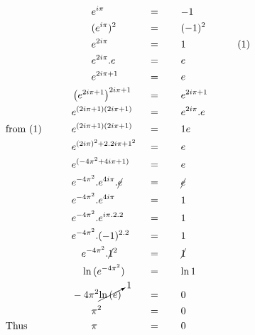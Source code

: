 \begin{alignat*}{4}
&\,&&\qquad e^{i\pi}&&\,=\qquad-1\\
&\,&&\qquad (e^{i\pi})^2&&\,=\qquad(-1)^2\\
&\,&&\qquad e^{2i\pi}&&\,=\qquad1&&\qquad(1)\\
&\,&&\qquad e^{2i\pi}.e&&\,=\qquad e\\
&\,&&\qquad e^{2i\pi+1}&&\,=\qquad e\\
&\,&&\left(e^{2i\pi+1}\right)^{2i\pi+1}&&\,=\qquad e^{2i\pi+1}\\
&\,&&e^{(2i\pi+1)(2i\pi+1)}&&\,=\qquad e^{2i\pi}.e\\
&\mathrm{from~(1)}\qquad&&e^{(2i\pi+1)(2i\pi+1)}&&\,=\qquad1e\\
&\,&&e^{(2i\pi)^2+2.2i\pi+1^2}&&\,=\qquad e\\
&\,&&e^{(-4\pi^2+4i\pi+1)}&&\,=\qquad e\\
&\,&&e^{-4\pi^2}.e^{4i\pi}.\cancel{e}&&\,=\qquad\cancel{e}\\
&\,&&e^{-4\pi^2}.e^{4i\pi}&&\,=\qquad1\\
&\,&&e^{-4\pi^2}.e^{i\pi.2.2}&&\,=\qquad1\\
&\,&&e^{-4\pi^2}.(-1)^{2.2}&&\,=\qquad1\\
&\,&&\quad e^{-4\pi^2}.\cancel{1}^2&&\,=\qquad\cancel{1}\\
&\,&&\quad \ln{(e^{-4\pi^2})}&&\,=\qquad\ln1\\
&\,&&-4\pi^2\cancelto{1}{\ln{(e)}}&&\,=\qquad0\\
&\,&&\qquad \pi^2&&\,=\qquad0\\
&\mathrm{Thus}&&\qquad \pi&&\,=\qquad0
\end{alignat*}

